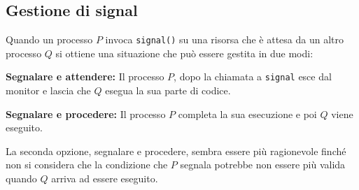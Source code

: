\subsection{Gestione di signal}
Quando un processo $P$ invoca \texttt{signal()} su una risorsa che è attesa da un altro processo $Q$ si ottiene una situazione che può essere gestita in due modi:
\begin{sitemize}
    \item \textbf{Segnalare e attendere:} Il processo $P$, dopo la chiamata a \texttt{signal} esce dal monitor e lascia che $Q$ esegua la sua parte di codice.
    \item \textbf{Segnalare e procedere:} Il processo $P$ completa la sua esecuzione e poi $Q$ viene eseguito.
\end{sitemize}

\spacer
La seconda opzione, segnalare e procedere, sembra essere più ragionevole finché non si considera che la condizione che $P$ segnala potrebbe non essere più valida quando $Q$ arriva ad essere eseguito.
